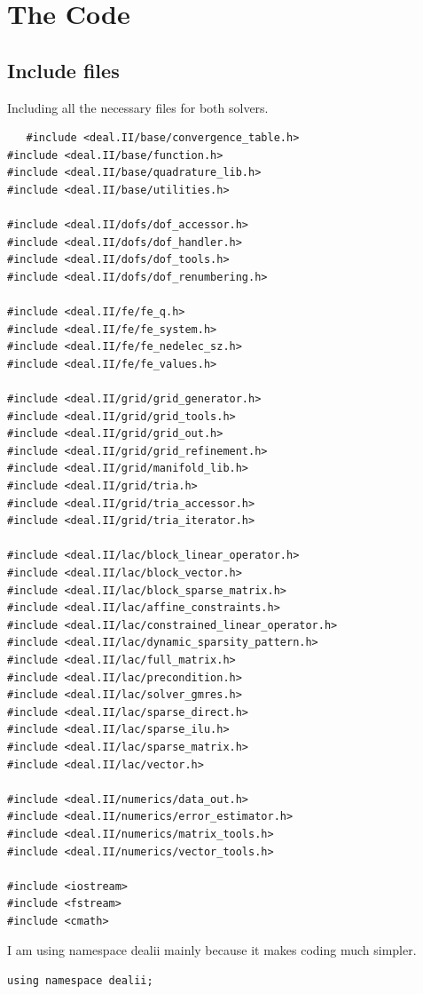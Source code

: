 \documentclass{article}
\begin{document}
   \section*{The Code}

   \subsection*{Include files}
   Including all the necessary files for both solvers. 
   \begin{lstlisting}
   #include <deal.II/base/convergence_table.h>
#include <deal.II/base/function.h>
#include <deal.II/base/quadrature_lib.h>
#include <deal.II/base/utilities.h>

#include <deal.II/dofs/dof_accessor.h>
#include <deal.II/dofs/dof_handler.h>
#include <deal.II/dofs/dof_tools.h>
#include <deal.II/dofs/dof_renumbering.h>

#include <deal.II/fe/fe_q.h>
#include <deal.II/fe/fe_system.h>
#include <deal.II/fe/fe_nedelec_sz.h>
#include <deal.II/fe/fe_values.h>

#include <deal.II/grid/grid_generator.h>
#include <deal.II/grid/grid_tools.h>
#include <deal.II/grid/grid_out.h>
#include <deal.II/grid/grid_refinement.h>
#include <deal.II/grid/manifold_lib.h>
#include <deal.II/grid/tria.h>
#include <deal.II/grid/tria_accessor.h>
#include <deal.II/grid/tria_iterator.h>

#include <deal.II/lac/block_linear_operator.h>
#include <deal.II/lac/block_vector.h>
#include <deal.II/lac/block_sparse_matrix.h>
#include <deal.II/lac/affine_constraints.h>
#include <deal.II/lac/constrained_linear_operator.h>
#include <deal.II/lac/dynamic_sparsity_pattern.h>
#include <deal.II/lac/full_matrix.h>
#include <deal.II/lac/precondition.h>
#include <deal.II/lac/solver_gmres.h>
#include <deal.II/lac/sparse_direct.h>
#include <deal.II/lac/sparse_ilu.h>
#include <deal.II/lac/sparse_matrix.h>
#include <deal.II/lac/vector.h>

#include <deal.II/numerics/data_out.h>
#include <deal.II/numerics/error_estimator.h>
#include <deal.II/numerics/matrix_tools.h>
#include <deal.II/numerics/vector_tools.h>

#include <iostream>
#include <fstream>
#include <cmath>

\end{lstlisting}

I am using namespace dealii mainly because it makes coding much simpler.
\begin{lstlisting}
using namespace dealii;
\end{lstlisting}
\end{document}
